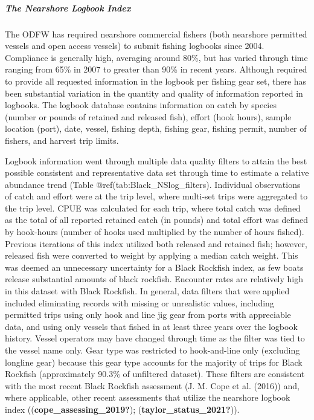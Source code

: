 \documentclass[11pt,
  english,
  letterpaper,
]{article}
\begin{document}
\hypertarget{the-nearshore-logbook-index}{%
\subparagraph{The Nearshore Logbook Index}\label{the-nearshore-logbook-index}}

The ODFW has required nearshore commercial fishers (both nearshore permitted vessels and open access vessels) to submit fishing logbooks since 2004. Compliance is generally high, averaging around 80\%, but has varied through time ranging from 65\% in 2007 to greater than 90\% in recent years. Although required to provide all requested information in the logbook per fishing gear set, there has been substantial variation in the quantity and quality of information reported in logbooks. The logbook database contains information on catch by species (number or pounds of retained and released fish), effort (hook hours), sample location (port), date, vessel, fishing depth, fishing gear, fishing permit, number of fishers, and harvest trip limits.

Logbook information went through multiple data quality filters to attain the best possible consistent and representative data set through time to estimate a relative abundance trend (Table @ref(tab:Black\_NSlog\_filters). Individual observations of catch and effort were at the trip level, where multi-set trips were aggregated to the trip level. CPUE was calculated for each trip, where total catch was defined as the total of all reported retained catch (in pounds) and total effort was defined by hook-hours (number of hooks used multiplied by the number of hours fished). Previous iterations of this index utilized both released and retained fish; however, released fish were converted to weight by applying a median catch weight. This was deemed an unnecessary uncertainty for a Black Rockfish index, as few boats release substantial amounts of black rockfish. Encounter rates are relatively high in this dataset with Black Rockfish. In general, data filters that were applied included eliminating records with missing or unrealistic values, including permitted trips using only hook and line jig gear from ports with appreciable data, and using only vessels that fished in at least three years over the logbook history. Vessel operators may have changed through time as the filter was tied to the vessel name only. Gear type was restricted to hook-and-line only (excluding longline gear) because this gear type accounts for the majority of trips for Black Rockfish (approximately 90.3\% of unfiltered dataset). These filters are consistent with the most recent Black Rockfish assessment (J. M. Cope et al. (2016)) and, where applicable, other recent assessments that utilize the nearshore logbook index ((\textbf{cope\_assessing\_2019?}); (\textbf{taylor\_status\_2021?})).
\end{document}
